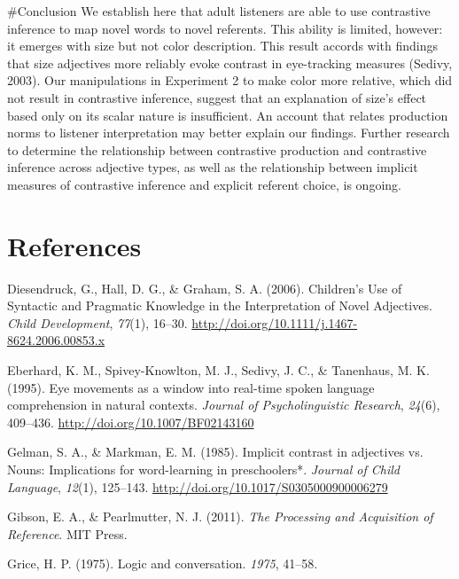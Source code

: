 \documentclass[10pt, letterpaper]{article}
\begin{document}
\#Conclusion We establish here that adult listeners are able to use
contrastive inference to map novel words to novel referents. This
ability is limited, however: it emerges with size but not color
description. This result accords with findings that size adjectives more
reliably evoke contrast in eye-tracking measures (Sedivy, 2003). Our
manipulations in Experiment 2 to make color more relative, which did not
result in contrastive inference, suggest that an explanation of size's
effect based only on its scalar nature is insufficient. An account that
relates production norms to listener interpretation may better explain
our findings. Further research to determine the relationship between
contrastive production and contrastive inference across adjective types,
as well as the relationship between implicit measures of contrastive
inference and explicit referent choice, is ongoing.

\hypertarget{references}{%
\section*{References}\label{references}}

\hypertarget{refs}{}
\leavevmode\hypertarget{ref-diesendruck_childrens_2006}{}%
Diesendruck, G., Hall, D. G., \& Graham, S. A. (2006). Children's Use of
Syntactic and Pragmatic Knowledge in the Interpretation of Novel
Adjectives. \emph{Child Development}, \emph{77}(1), 16--30.
\url{http://doi.org/10.1111/j.1467-8624.2006.00853.x}

\leavevmode\hypertarget{ref-eberhard_eye_1995}{}%
Eberhard, K. M., Spivey-Knowlton, M. J., Sedivy, J. C., \& Tanenhaus, M.
K. (1995). Eye movements as a window into real-time spoken language
comprehension in natural contexts. \emph{Journal of Psycholinguistic
Research}, \emph{24}(6), 409--436.
\url{http://doi.org/10.1007/BF02143160}

\leavevmode\hypertarget{ref-gelman_implicit_1985}{}%
Gelman, S. A., \& Markman, E. M. (1985). Implicit contrast in adjectives
vs. Nouns: Implications for word-learning in preschoolers*.
\emph{Journal of Child Language}, \emph{12}(1), 125--143.
\url{http://doi.org/10.1017/S0305000900006279}

\leavevmode\hypertarget{ref-gibson_processing_2011}{}%
Gibson, E. A., \& Pearlmutter, N. J. (2011). \emph{The Processing and
Acquisition of Reference}. MIT Press.

\leavevmode\hypertarget{ref-grice1975logic}{}%
Grice, H. P. (1975). Logic and conversation. \emph{1975}, 41--58.
\end{document}

